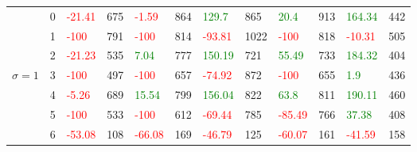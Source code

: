 \begin{table}[!htb]
\begin{adjustwidth}{-0.8in}{-0.9in}
\begin{tabular}{|p{4em}|p{2em}|p{3em}|p{3em}|p{3em}|p{3em}|p{3em}|p{3em}|p{3em}|p{3em}|p{3em}|p{3em}|}
            & 0 & \textcolor{red}{-21.41} & 675 & \textcolor{red}{-1.59} & 864 & \textcolor{green}{129.7} & 865 & \textcolor{green}{20.4} & 913 & \textcolor{green}{164.34} & 442\\\cline{3-12}
            & 1 & \textcolor{red}{-100} & 791 & \textcolor{red}{-100} & 814 & \textcolor{red}{-93.81} & 1022 & \textcolor{red}{-100} & 818 & \textcolor{red}{-10.31} & 505\\\cline{3-12}
            & 2 & \textcolor{red}{-21.23} & 535 & \textcolor{green}{7.04} & 777 & \textcolor{green}{150.19} & 721 & \textcolor{green}{55.49} & 733 & \textcolor{green}{184.32} & 404\\\cline{3-12}
            $\sigma=1$ & 3 & \textcolor{red}{-100} & 497 & \textcolor{red}{-100} & 657 & \textcolor{red}{-74.92} & 872 & \textcolor{red}{-100} & 655 & \textcolor{green}{1.9} & 436\\\cline{3-12}
            & 4 & \textcolor{red}{-5.26} & 689 & \textcolor{green}{15.54} & 799 & \textcolor{green}{156.04} & 822 & \textcolor{green}{63.8} & 811 & \textcolor{green}{190.11} & 460\\\cline{3-12}
            & 5 & \textcolor{red}{-100} & 533 & \textcolor{red}{-100} & 612 & \textcolor{red}{-69.44} & 785 & \textcolor{red}{-85.49} & 766 & \textcolor{green}{37.38} & 408\\\cline{3-12}
            & 6 & \textcolor{red}{-53.08} & 108 & \textcolor{red}{-66.08} & 169 & \textcolor{red}{-46.79} & 125 & \textcolor{red}{-60.07} & 161 & \textcolor{red}{-41.59} & 158\\\hline\hline
            

\end{tabular}
\end{adjustwidth}
\end{table}
